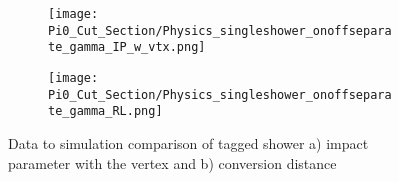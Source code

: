 \begin{figure}[H]
\centering
  \begin{subfigure}[t]{0.3\textwidth}
    \centering
\texttt{[image: Pi0\_Cut\_Section/Physics\_singleshower\_onoffseparate\_gamma\_IP\_w\_vtx.png]}
  \caption{ }
  \end{subfigure} 
  \hspace{20mm}
  \begin{subfigure}[t]{0.3\textwidth}
    \centering
\texttt{[image: Pi0\_Cut\_Section/Physics\_singleshower\_onoffseparate\_gamma\_RL.png]}
  \caption{ }
  \end{subfigure} 
\caption{ Data to simulation comparison of tagged shower a) impact parameter with the vertex and b) conversion distance }
\label{fig:physics_singleshower_ip}
\end{figure}

